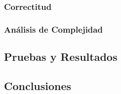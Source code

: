 \subsubsection{Correctitud}



\subsubsection{Análisis de Complejidad}



\subsection{Pruebas y Resultados}


\subsection{Conclusiones}


